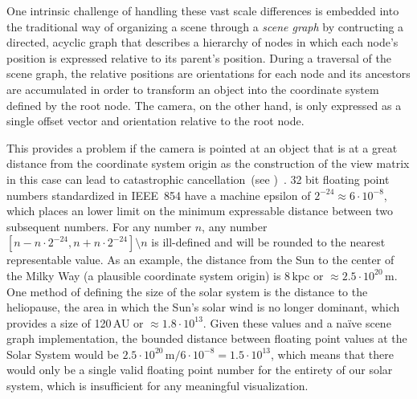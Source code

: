 One intrinsic challenge of handling these vast scale differences is embedded into the traditional way of organizing a scene through a \emph{scene graph} by contructing a directed, acyclic graph that describes a hierarchy of nodes in which each node's position is expressed relative to its parent's position.  During a traversal of the scene graph, the relative positions are orientations for each node and its ancestors are accumulated in order to transform an object into the coordinate system defined by the root node.  The camera, on the other hand, is only expressed as a single offset vector and orientation relative to the root node.  

This provides a problem if the camera is pointed at an object that is at a great distance from the coordinate system origin as the construction of the view matrix in this case can lead to catastrophic cancellation~(see )~\cite{cuyt2001remarkable}.  32 bit floating point numbers standardized in IEEE~854 have a machine epsilon of $2^{-24} \approx 6 \cdot 10^{-8}$, which places an lower limit on the minimum expressable distance between two subsequent numbers.  For any number $n$, any number $\left[ n - n \cdot 2^{-24}, n + n \cdot 2^{-24}\right] \setminus{n}$ is ill-defined and will be rounded to the nearest representable value.  As an example, the distance from the Sun to the center of the Milky Way (a plausible coordinate system origin) is 8\,kpc or $\approx 2.5 \cdot 10^{20}\,$m.  One method of defining the size of the solar system is the distance to the heliopause, the area in which the Sun's solar wind is no longer dominant, which provides a size of 120\,AU or $\approx 1.8 \cdot 10^{13}$.  Given these values and a na\"ive scene graph implementation, the bounded distance between floating point values at the Solar System would be $2.5 \cdot 10^{20}\,\textrm{m} / 6 \cdot 10^{-8} = 1.5 \cdot 10^{13}$, which means that there would only be a single valid floating point number for the entirety of our solar system, which is insufficient for any meaningful visualization.

